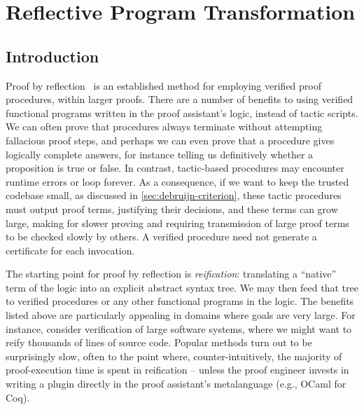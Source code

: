 \chapter{Reflective Program Transformation} \label{ch:reflection}

\section{Introduction} \label{sec:reification-by-parametricity:intro}


Proof by reflection~\cite{ReflectionTACS97} is an established method for employing verified proof procedures, within larger proofs.
There are a number of benefits to using verified functional programs written in the proof assistant's logic, instead of tactic scripts.
We can often prove that procedures always terminate without attempting fallacious proof steps, and perhaps we can even prove that a procedure gives logically complete answers, for instance telling us definitively whether a proposition is true or false.
In contrast, tactic-based procedures may encounter runtime errors or loop forever.
As a consequence, if we want to keep the trusted codebase small, as discussed in \autoref{sec:debruijn-criterion}, these tactic procedures must output proof terms, justifying their decisions, and these terms can grow large, making for slower proving and requiring transmission of large proof terms to be checked slowly by others.
A verified procedure need not generate a certificate for each invocation.

The starting point for proof by reflection is \emph{reification}: translating a ``native'' term of the logic into an explicit abstract syntax tree.
We may then feed that tree to verified procedures or any other functional programs in the logic.
The benefits listed above are particularly appealing in domains where goals are very large.
For instance, consider verification of large software systems, where we might want to reify thousands of lines of source code.
Popular methods turn out to be surprisingly slow, often to the point where, counter-intuitively, the majority of proof-execution time is spent in reification -- unless the proof engineer invests in writing a plugin directly in the proof assistant's metalanguage (e.g., OCaml for Coq).

